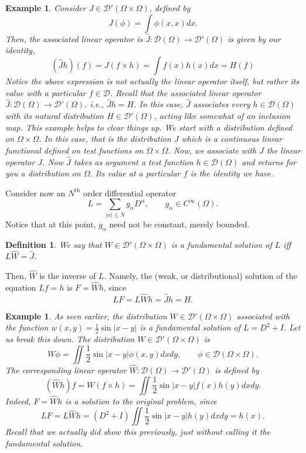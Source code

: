 \documentclass[letterpaper,twoside,11pt]{article}
\theoremstyle{mystyle}
\newtheorem{definition}{Definition}[section]
\newtheorem*{ex}{Example}
\newtheorem*{example}{Example}
\newcommand{\DD}{\mathcal D}
\newcommand{\cg}{\color{gray}}
\newcommand{\cbk}{\color{black}}
\newcommand{\cblu}{\color{blue}}
\begin{document}
\begin{ex} Consider 
  $J\in \DD'(\Omega\times \Omega)$, defined by 
  \[J(\phi) = \int \phi(x, x)dx.\]
  Then, the associated linear operator is $\hat J: \DD(\Omega) \to \DD'(\Omega)$ is given by 
  our identity, 
  \[\left( {\hat Jh} \right)\left( f \right) = J\left( {f \times h} \right) = \int {f\left( x \right)h\left( x \right)dx}  = H\left( f \right)\]
  \cg Notice the above expression is not actually the linear operator itself, but rather its value with a particular $f \in \DD$. Recall that the associated linear operator $\hat J: \DD(\Omega) \to \DD'(\Omega)$. \cbk i.e., $\hat Jh = H$. In this case, $\hat J$ associates every $h \in \DD(\Omega)$ with its natural distribution $H \in \DD'(\Omega)$, acting like somewhat of an inclusion map. 
  \cblu This example helps to clear things up. We start with a distribution defined on $\Omega\times \Omega$. In this case, that is the distribution $J$ which is a continuous linear functional defined on test functions on $\Omega\times \Omega$. Now, we associate with $J$ the linear operator $\hat J$. Now $\hat J$ takes as argument a test function $h\in \DD(\Omega)$ and returns for you a distribution on $\Omega$. Its value at a particular $f$ is the identity we have. \cbk

\end{ex}
Consider now an $N^{\text{th}}$ order differential operator 
\[L = \sum_{|\alpha|\leq N} g_\alpha D^\alpha, \qquad g_\alpha \in C^\infty(\Omega).\]
\cg Notice that at this point, $g_\alpha$ need not be constant, merely bounded. \cbk 
\begin{definition}
  We say that $W \in \DD'\left( \Omega\times \Omega \right)$ is a fundamental solution of $L$ iff $L\hat W = \hat J$. 
\end{definition}
Then, $\hat W$ is the inverse of $L$. Namely, the (weak, or distributional) solution of the equation $Lf=h$ is $F = \hat W h$, since 
\[LF = L\hat W h = \hat J h = H.\]
\begin{example}
  As seen earlier, the distribution $W\in \DD'\left( \Omega\times \Omega \right)$ associated with the function $w\left( x, y \right) = \frac{1}{2}\sin |x-y|$ is a fundamental solution of $L = D^2 + I $. Let us break this down. The distribution $W\in \DD'\left( \Omega\times \Omega \right)$ is 
  \[W\phi  =  {\iint {\frac{1}{2}\sin \left| {x - y} \right|\phi \left( {x,y} \right)dxdy} } ,\qquad \phi  \in \mathcal{D}\left( {\Omega  \times \Omega } \right).\]
  The corresponding linear operator $\hat W : \DD(\Omega) \to \DD' (\Omega)$ is defined by 
  \[\left( {\hat Wh} \right)f = W\left( {f \times h} \right) = {\iint {\frac{1}{2}\sin \left| {x - y} \right|f\left( x \right)h\left( y \right)dxdy} } .\]
  Indeed, $F=\hat Wh$ is a solution to the original problem, since 
  \[LF = L\hat Wh = \left( {{D^2} + I} \right) {\iint {\frac{1}{2}\sin \left| {x - y} \right|h\left( y \right)dxdy} }  = h\left( x \right).\]
  \cg Recall that we actually did show this previously, just without calling it the fundamental solution. \cbk 
\end{example}
\end{document}
